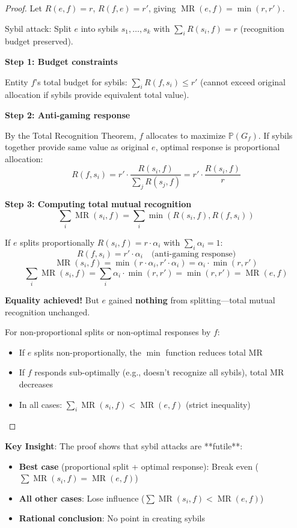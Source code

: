 \documentclass[11pt,a4paper]{article}
\theoremstyle{definition}
\theoremstyle{remark}
\DeclareMathOperator{\MR}{MR}
\begin{document}
\begin{proof}
Let $R(e,f) = r$, $R(f,e) = r'$, giving $\MR(e,f) = \min(r, r')$.

Sybil attack: Split $e$ into sybils $s_1, \dots, s_k$ with $\sum_i R(s_i, f) = r$ (recognition budget preserved).

\textbf{Step 1: Budget constraints}

Entity $f$'s total budget for sybils: $\sum_i R(f, s_i) \le r'$ (cannot exceed original allocation if sybils provide equivalent total value).

\textbf{Step 2: Anti-gaming response}

By the Total Recognition Theorem, $f$ allocates to maximize $\mathbb{P}(G_f)$. If sybils together provide same value as original $e$, optimal response is proportional allocation:
\[ R(f, s_i) = r' \cdot \frac{R(s_i, f)}{\sum_j R(s_j, f)} = r' \cdot \frac{R(s_i, f)}{r} \]

\textbf{Step 3: Computing total mutual recognition}
\[ \sum_i \MR(s_i, f) = \sum_i \min(R(s_i, f), R(f, s_i)) \]

If $e$ splits proportionally $R(s_i, f) = r \cdot \alpha_i$ with $\sum_i \alpha_i = 1$:
\[ R(f, s_i) = r' \cdot \alpha_i \quad \text{(anti-gaming response)} \]
\[ \MR(s_i, f) = \min(r \cdot \alpha_i, r' \cdot \alpha_i) = \alpha_i \cdot \min(r, r') \]
\[ \sum_i \MR(s_i, f) = \sum_i \alpha_i \cdot \min(r, r') = \min(r, r') = \MR(e,f) \]

\textbf{Equality achieved!} But $e$ gained \textbf{nothing} from splitting---total mutual recognition unchanged.

For non-proportional splits or non-optimal responses by $f$:
\begin{itemize}
\item If $e$ splits non-proportionally, the $\min$ function reduces total MR
\item If $f$ responds sub-optimally (e.g., doesn't recognize all sybils), total MR decreases
\item In all cases: $\sum_i \MR(s_i, f) < \MR(e,f)$ (strict inequality)
\end{itemize}
\end{proof}

\textbf{Key Insight}: The proof shows that sybil attacks are **futile**:
\begin{itemize}
\item \textbf{Best case} (proportional split + optimal response): Break even ($\sum \MR(s_i, f) = \MR(e,f)$)
\item \textbf{All other cases}: Lose influence ($\sum \MR(s_i, f) < \MR(e,f)$)
\item \textbf{Rational conclusion}: No point in creating sybils
\end{itemize}
\end{document}
